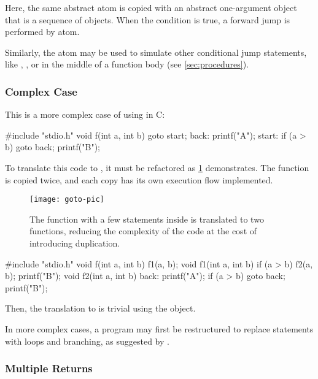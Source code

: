 \documentclass[sigplan,nonacm]{acmart}
\begin{document}
Here, the same abstract atom  is copied with an abstract one-argument object that is a sequence of objects.
When the condition is true, a forward jump is performed by  atom.

Similarly, the atom  may be used to simulate other conditional jump statements, like , , or  in the middle of a function body (see \cref{sec:procedures}).

\subsubsection{Complex Case}

This is a more complex case of using  in C:

\begin{ffcode}
#include "stdio.h"
void f(int a, int b) {
  goto start;
back:
  printf("A");
start:
  if (a > b) goto back;
  printf("B");
}
\end{ffcode}

To translate this code to \eolang{}, it must be refactored as \cref{fig:goto} demonstrates.
The function  is copied twice, and each copy has its own execution flow implemented.

\begin{figure}
\texttt{[image: goto-pic]}
\caption{The function  with a few  statements inside is translated to two functions, reducing the complexity of the code at the cost of introducing duplication.}
\label{fig:goto}
\end{figure}

\begin{ffcode}
#include "stdio.h"
void f(int a, int b) { f1(a, b); }
void f1(int a, int b) {
  if (a > b) f2(a, b);
  printf("B");
}
void f2(int a, int b) {
back:
  printf("A");
  if (a > b) goto back;
  printf("B");
}
\end{ffcode}

Then, the translation to \eolang{} is trivial using the  object.

In more complex cases, a program may first be restructured to replace  statements with loops and branching, as suggested by \citet{williams1985restructuring,pan1996formal,erosa1994taming,ceccato2008goto}.

\subsubsection{Multiple Returns}
\end{document}
